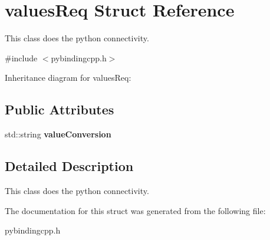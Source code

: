 \hypertarget{structvaluesReq}{}\section{values\+Req Struct Reference}
\label{structvaluesReq}


This class does the python connectivity.  




{\ttfamily \#include $<$pybindingcpp.\+h$>$}



Inheritance diagram for values\+Req\+:
\subsection*{Public Attributes}
\begin{DoxyCompactItemize}
\item 
std\+::string {\bfseries value\+Conversion}\hypertarget{structvaluesReq_aed9929ea6e79f589ec19777af07bd502}{}\label{structvaluesReq_aed9929ea6e79f589ec19777af07bd502}

\end{DoxyCompactItemize}


\subsection{Detailed Description}
This class does the python connectivity. 

The documentation for this struct was generated from the following file\+:\begin{DoxyCompactItemize}
\item 
pybindingcpp.\+h\end{DoxyCompactItemize}
